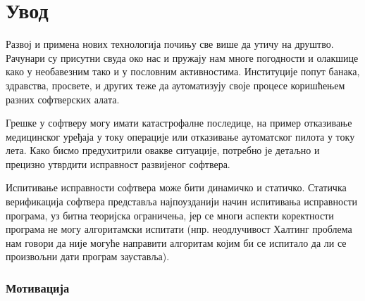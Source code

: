 \documentclass[12pt,oneside]{memoir}
\begin{document}
\frontmatter
\naslovna
\komisija
\mainmatter
\tableofcontents





\chapter{Увод} \label{uvod}

 Развој и примена нових технологија почињу све више да утичу на друштво. Рачунари су присутни свуда око нас и пружају нам многе погодности и олакшице како у необавезним тако и у пословним активностима. Институције попут банака, здравства, просвете, и других теже да аутоматизују своје процесе коришћењем разних софтверских алата.  
 
 Грешке у софтверу могу имати катастрофалне последице, на пример отказивање медицинског уређаја у току операције или отказивање аутоматског пилота у току лета. Како бисмо предухитрили овакве ситуације, потребно је детаљно и прецизно утврдити исправност развијеног софтвера. 
 
  Испитивање исправности софтвера може бити динамичко и статичко. Статичка верификација софтвера представља најпоузданији начин испитивања исправности програма, уз битна теоријска ограничења, јер се многи аспекти коректности програма не могу алгоритамски испитати (нпр. неодлучивост Халтинг проблема \cite{halting} нам говори да није могуће направити алгоритам којим би се испитало да ли се произвољни дати програм зауставља). 
  
  
\subsection{Мотивација}
\end{document}

